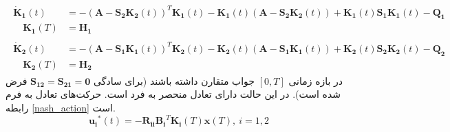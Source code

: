 \begin{align}
	\begin{split}
		\boldsymbol{\dot{K}_1}(t) &= -(\boldsymbol{A}-\boldsymbol{S_2}\boldsymbol{K_2}(t))^T\boldsymbol{K_1}(t)-\boldsymbol{K_1}(t)(\boldsymbol{A}-\boldsymbol{S_2K_2}(t))+
		\boldsymbol{K_1}(t)\boldsymbol{S_1K_1}(t)-\boldsymbol{Q_1}\\
		\quad \boldsymbol{K_1}(T) &= \boldsymbol{H_1}
	\end{split}\\
	\begin{split}
		\boldsymbol{\dot{K}_2}(t) &= -(\boldsymbol{A}-\boldsymbol{S_1}\boldsymbol{K_1}(t))^T\boldsymbol{K_2}(t)-\boldsymbol{K_2}(t)(\boldsymbol{A}-\boldsymbol{S_1K_1}(t))+
\boldsymbol{K_2}(t)\boldsymbol{S_2K_2}(t)-\boldsymbol{Q_2}\\
\quad \boldsymbol{K_2}(T) &= \boldsymbol{H_2}
	\end{split}
\end{align}
در بازه زمانی 
$[0, T]$
جواب متقارن داشته ‌باشند (برای سادگی 
$\boldsymbol{S_{12}}=\boldsymbol{S_{21}} =\boldsymbol 0 $
فرض شده است).
در این حالت دارای تعادل منحصر به فرد است. حرکت‌های تعادل به فرم رابطه
\ref{nash_action}
است.
\begin{equation}\label{nash_action}
	\boldsymbol{u_i}^*(t) = -\boldsymbol{R_{ii}B_i}^T\boldsymbol{K_i}(T)\boldsymbol{x}(T),~i = 1, 2
\end{equation}
